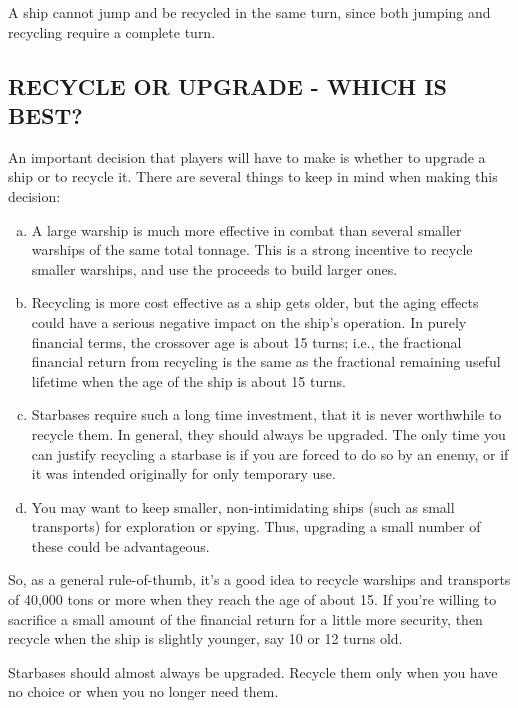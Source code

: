 \documentclass[10pt,titlepage]{article}
\begin{document}
A ship cannot jump and be recycled in the same turn, since both jumping and
recycling require a complete turn.


\subsection{RECYCLE OR UPGRADE - WHICH IS BEST?}
\label{sec:recycleorupgrade}


An important decision that players will have to make is whether to upgrade a
ship or to recycle it.  There are several things to keep in mind when making
this decision:

\begin{enumerate}[a.]
\item A large warship is much more effective in combat than several
	smaller warships of the same total tonnage.  This is a strong
	incentive to recycle smaller warships, and use the proceeds to
	build larger ones.

\item Recycling is more cost effective as a ship gets older, but
	the aging effects could have a serious negative impact on the
	ship's operation.  In purely financial terms, the crossover age
	is about 15 turns; i.e., the fractional financial return from
	recycling is the same as the fractional remaining useful lifetime
	when the age of the ship is about 15 turns.

\item Starbases require such a long time investment, that it is
	never worthwhile to recycle them.  In general, they should always
	be upgraded.  The only time you can justify recycling a starbase
	is if you are forced to do so by an enemy, or if it was intended
	originally for only temporary use.

\item You may want to keep smaller, non-intimidating ships (such as
	small transports) for exploration or spying.  Thus, upgrading a
	small number of these could be advantageous.
\end{enumerate}


So, as a general rule-of-thumb, it's a good idea to recycle warships and
transports of 40,000 tons or more when they reach the age of about 15.  If
you're willing to sacrifice a small amount of the financial return for a little
more security, then recycle when the ship is slightly younger, say 10 or 12
turns old.

Starbases should almost always be upgraded.  Recycle them only when you have
no choice or when you no longer need them.
\end{document}
